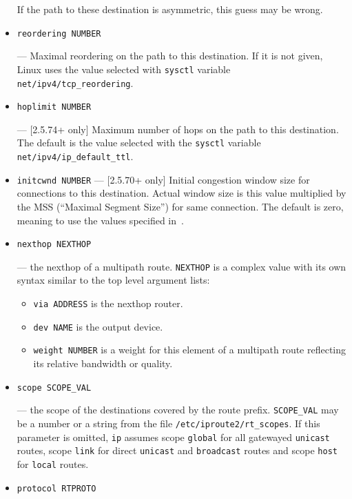\begin{itemize}
\begin{NB}
  If the path to these destination is asymmetric, this guess may be wrong.
\end{NB}

\item \verb|reordering NUMBER|

--- \threeonly Maximal reordering on the path to this destination.
    If it is not given, Linux uses the value selected with \verb|sysctl|
    variable \verb|net/ipv4/tcp_reordering|.

\item \verb|hoplimit NUMBER|

--- [2.5.74+ only] Maximum number of hops on the path to this destination.
    The default is the value selected with the \verb|sysctl| variable
    \verb|net/ipv4/ip_default_ttl|.

\item \verb|initcwnd NUMBER|
--- [2.5.70+ only] Initial congestion window size for connections to
    this destination. Actual window size is this value multiplied by the
    MSS (``Maximal Segment Size'') for same connection. The default is
    zero, meaning to use the values specified in~\cite{RFC2414}.

\item \verb|nexthop NEXTHOP|

--- the nexthop of a multipath route. \verb|NEXTHOP| is a complex value
with its own syntax similar to the top level argument lists:
\begin{itemize}
\item \verb|via ADDRESS| is the nexthop router.
\item \verb|dev NAME| is the output device.
\item \verb|weight NUMBER| is a weight for this element of a multipath
route reflecting its relative bandwidth or quality.
\end{itemize}

\item \verb|scope SCOPE_VAL|

--- the scope of the destinations covered by the route prefix.
\verb|SCOPE_VAL| may be a number or a string from the file
\verb|/etc/iproute2/rt_scopes|.
If this parameter is omitted,
\verb|ip| assumes scope \verb|global| for all gatewayed \verb|unicast|
routes, scope \verb|link| for direct \verb|unicast| and \verb|broadcast| routes
and scope \verb|host| for \verb|local| routes.

\item \verb|protocol RTPROTO|


\end{itemize}
